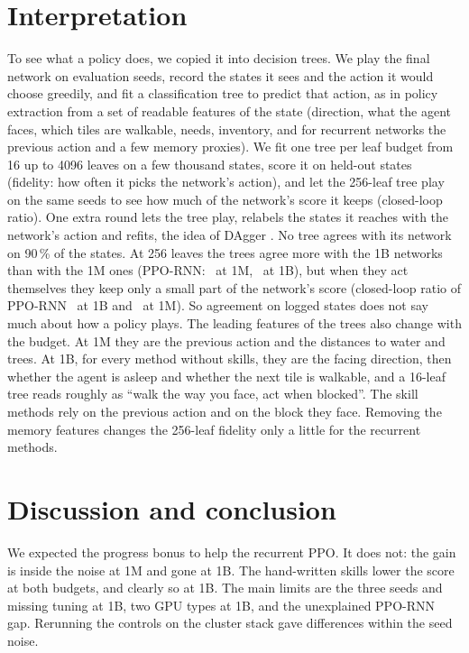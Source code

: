 \documentclass[cameraready]{Interspeech}
\begin{document}
\section{Interpretation}

To see what a policy does, we copied it into decision trees. We play the final network on evaluation seeds, record the states it sees and the action it would choose greedily, and fit a classification tree \cite{breiman1984classification,pedregosa2011scikit} to predict that action, as in policy extraction \cite{bastani2018verifiable} from a set of readable features of the state (direction, what the agent faces, which tiles are walkable, needs, inventory, and for recurrent networks the previous action and a few memory proxies). We fit one tree per leaf budget from 16 up to 4096 leaves on a few thousand states, score it on held-out states (fidelity: how often it picks the network's action), and let the 256-leaf tree play on the same seeds to see how much of the network's score it keeps (closed-loop ratio). One extra round lets the tree play, relabels the states it reaches with the network's action and refits, the idea of DAgger \cite{ross2011reduction}. No tree agrees with its network on 90\,\% of the states. At 256 leaves the trees agree more with the 1B networks than with the 1M ones (PPO-RNN: \fidTwoFiftySixOneMPpoRnn\ at 1M, \fidTwoFiftySixOneBPpoRnn\ at 1B), but when they act themselves they keep only a small part of the network's score (closed-loop ratio of PPO-RNN \closedLoopOneBPpoRnn\ at 1B and \closedLoopOneMPpoRnn\ at 1M). So agreement on logged states does not say much about how a policy plays. The leading features of the trees also change with the budget. At 1M they are the previous action and the distances to water and trees. At 1B, for every method without skills, they are the facing direction, then whether the agent is asleep and whether the next tile is walkable, and a 16-leaf tree reads roughly as ``walk the way you face, act when blocked''. The skill methods rely on the previous action and on the block they face. Removing the memory features changes the 256-leaf fidelity only a little for the recurrent methods.

\section{Discussion and conclusion}

We expected the progress bonus to help the recurrent PPO. It does not: the gain is inside the noise at 1M and gone at 1B. The hand-written skills lower the score at both budgets, and clearly so at 1B. The main limits are the three seeds and missing tuning at 1B, two GPU types at 1B, and the unexplained PPO-RNN gap. Rerunning the controls on the cluster stack gave differences within the seed noise.
\end{document}
